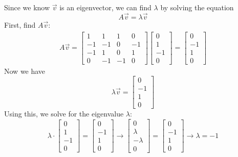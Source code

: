 \documentclass[]{article}
\newcommand{\bmat}[1]{\begin{bmatrix}#1\end{bmatrix}}
\begin{document}
    \section{}
    Since we know $\vec{v}$ is an eigenvector, we can find $\lambda$ by solving the equation
    \[ A\vec{v} = \lambda\vec{v} \]
    First, find $A\vec{v}$:
    \begin{gather*}
        A\vec{v} = \bmat{1&1&1&0\\-1&-1&0&-1\\-1&1&0&1\\0&-1&-1&0}\bmat{0\\1\\-1\\0} %
        = \bmat{0\\-1\\1\\0}
    \end{gather*}
    Now we have
    \[ \lambda\vec{v} = \bmat{0\\-1\\1\\0} \]
    Using this, we solve for the eigenvalue $\lambda$:
    \[ \lambda \cdot \bmat{0\\1\\-1\\0} = \bmat{0\\-1\\1\\0} \longrightarrow \bmat{0\\\lambda\\-\lambda\\0} = \bmat{0\\-1\\1\\0} \longrightarrow \boxed{\lambda = -1}\]
\end{document}
